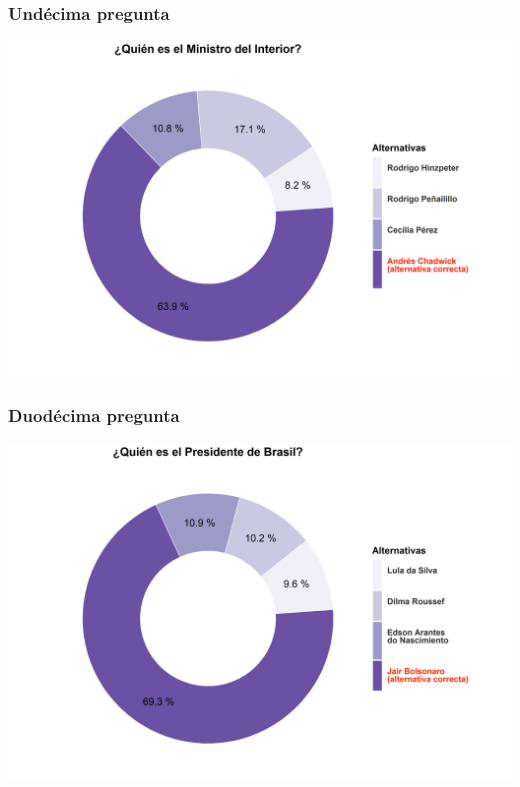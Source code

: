 \documentclass[
  14pt,
]{book}
\begin{document}
\hypertarget{unduxe9cima-pregunta}{%
\subsubsection{Undécima pregunta}\label{unduxe9cima-pregunta}}

\begin{center}\includegraphics[width=52.49in]{images/ccivico_11} \end{center}

\hypertarget{duoduxe9cima-pregunta}{%
\subsubsection{Duodécima pregunta}\label{duoduxe9cima-pregunta}}

\begin{center}\includegraphics[width=52.49in]{images/ccivico_12} \end{center}
\end{document}
